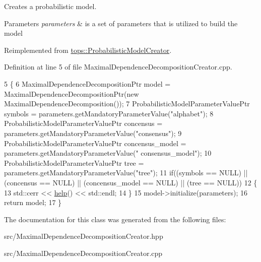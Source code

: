 Creates a probabilistic model. 


\begin{DoxyParams}{Parameters}
{\em parameters} & is a set of parameters that is utilized to build the model \\
\hline
\end{DoxyParams}


Reimplemented from \hyperlink{classtops_1_1ProbabilisticModelCreator_afed6c8ffa45fff446bdaa8b533da8f7c}{tops\+::\+Probabilistic\+Model\+Creator}.



Definition at line 5 of file Maximal\+Dependence\+Decomposition\+Creator.\+cpp.


\begin{DoxyCode}
5                                                                                                            
                \{
6     MaximalDependenceDecompositionPtr model = MaximalDependenceDecompositionPtr(\textcolor{keyword}{new} 
      MaximalDependenceDecomposition());
7     ProbabilisticModelParameterValuePtr symbols = parameters.getMandatoryParameterValue(\textcolor{stringliteral}{"alphabet"});
8     ProbabilisticModelParameterValuePtr concensus = parameters.getMandatoryParameterValue(\textcolor{stringliteral}{"consensus"});
9     ProbabilisticModelParameterValuePtr concensus\_model = parameters.getMandatoryParameterValue(\textcolor{stringliteral}{"
      consensus\_model"});
10     ProbabilisticModelParameterValuePtr tree = parameters.getMandatoryParameterValue(\textcolor{stringliteral}{"tree"});
11     \textcolor{keywordflow}{if}((symbols == NULL) || (concensus == NULL) || (concensus\_model == NULL) || (tree == NULL))
12     \{
13       std::cerr << \hyperlink{classtops_1_1ProbabilisticModelCreator_a468486a1562442aadfc53bb55c62496b}{help}() << std::endl;
14     \}
15     model->initialize(parameters);
16     \textcolor{keywordflow}{return} model;
17   \}
\end{DoxyCode}


The documentation for this class was generated from the following files\+:\begin{DoxyCompactItemize}
\item 
src/Maximal\+Dependence\+Decomposition\+Creator.\+hpp\item 
src/Maximal\+Dependence\+Decomposition\+Creator.\+cpp\end{DoxyCompactItemize}
